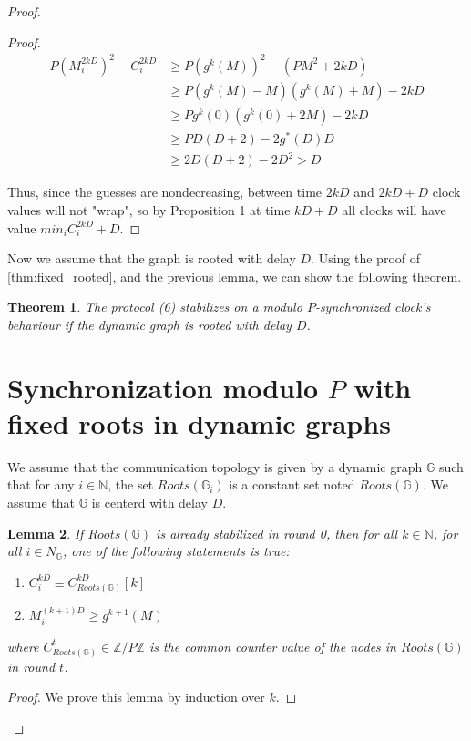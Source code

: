 \documentclass[11pt,letterpaper]{article}
\newtheorem{thm}{Theorem}
\newtheorem{lem}[thm]{Lemma}
\begin{document}
\begin{proof}
\begin{proof}
	\begin{align*}
		P(M_i^{2kD})^2 - C_i^{2kD} & \geq P(g^k(M))^2-(PM^2+2kD) \\
		& \geq P(g^k(M)-M)(g^k(M)+M)-2kD \\
		& \geq Pg^k(0)(g^k(0)+2M)-2kD \\
		& \geq PD(D+2)-2g^*(D)D \\
		& \geq 2D(D+2)-2D^2 > D
	\end{align*}

	Thus, since the guesses are nondecreasing, between time $2kD$
	and $2kD + D$ clock values will not "wrap", so by Proposition 1
	at time $kD + D$ all clocks will have value $min_i C_i^{2kD}+D$.
\end{proof}

Now we assume that the graph is rooted with delay $D$.
Using the proof of \ref{thm:fixed_rooted}, and the previous lemma, we can show the following theorem.

\begin{thm}
	The protocol (6) stabilizes on a modulo $P$-synchronized clock's behaviour if the dynamic graph is rooted with delay $D$.
\end{thm}

\section{Synchronization modulo $P$ with fixed roots in dynamic graphs}

We assume that the communication topology is given by a dynamic graph $\mathds{G}$
such that for any $i \in \mathds{N}$, the set $Roots(\mathds{G}_i)$ is a constant set noted $Roots(\mathds{G})$.
We assume that $\mathds{G}$ is centerd with delay $D$.

\begin{lem}
	If $Roots(\mathds{G})$ is already stabilized in round 0, then
	for all $k \in \mathds{N}$, for all $i \in N_\mathds{G}$,
	one of the following statements is true:
	\begin{enumerate}
		\item $C_i^{kD} \equiv C_{Roots(\mathds{G})}^{kD} [k]$
		\item $M_i^{(k+1)D} \geq g^{k+1}(M)$
	\end{enumerate}
	where $C_{Roots(\mathds{G})}^t \in \mathds{Z}/P\mathds{Z}$ is the common counter value of the nodes in $Roots(\mathds{G})$ in round $t$.
\end{lem}
\begin{proof}
	We prove this lemma by induction over $k$.


\end{proof}
\end{proof}
\end{document}
